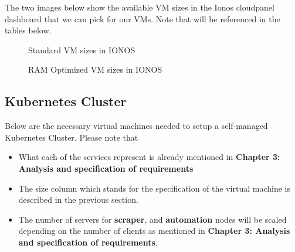 The two images below show the available VM sizes in the Ionos cloudpanel dashboard that we can pick for our VMs.
Note that will be referenced in the tables below.
\begin{figure}[H]
    \centering
    \caption{Standard VM sizes in IONOS}
    \label{fig:standard-vm-sizes}
\end{figure}
\begin{figure}[H]
    \centering
    \caption{RAM Optimized VM sizes in IONOS}
    \label{fig:ram-optimized-vm-sizes}
\end{figure}

\subsection{Kubernetes Cluster}
Below are the necessary virtual machines needed to setup a self-managed Kubernetes Cluster.
Please note that
\begin{itemize}
    \item What each of the services represent is already mentioned in \textbf{Chapter 3: Analysis and specification of requirements}
    \item The size column which stands for the specification of the virtual machine is described in the previous section.
    \item The number of servers for \textbf{scraper}, and \textbf{automation} nodes will be scaled depending on the number of clients as mentioned in \textbf{Chapter 3: Analysis and specification of requirements}.
\end{itemize}

